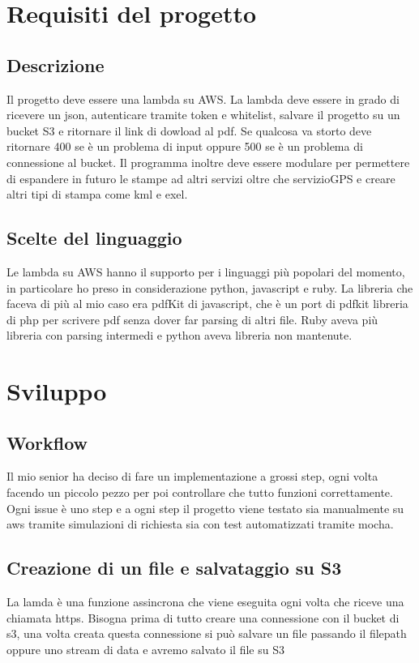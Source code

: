 \documentclass[12pt]{article}
\begin{document}
\section{Requisiti del progetto}
\subsection{Descrizione}
Il progetto deve essere una lambda su AWS. La lambda deve essere in grado di
ricevere un json, autenticare tramite token e whitelist, salvare il progetto su
un bucket S3 e ritornare il link di dowload al pdf. Se qualcosa va storto deve
ritornare 400 se è un problema di input oppure 500 se è un problema di connessione
al bucket.
Il programma inoltre deve essere modulare per permettere di espandere in futuro
le stampe ad altri servizi oltre che servizioGPS e creare altri tipi di stampa
come kml e exel.
\subsection{Scelte del linguaggio}
Le lambda su AWS hanno il supporto per i linguaggi più popolari del momento, in
particolare ho preso in considerazione python, javascript e ruby. La libreria
che faceva di più al mio caso era pdfKit di javascript, che è un port di pdfkit
libreria di php per scrivere pdf senza dover far parsing di altri file.
Ruby aveva più libreria con parsing intermedi e python aveva libreria non mantenute.


\section{Sviluppo}
\subsection{Workflow}
Il mio senior ha deciso di fare un implementazione a grossi step, ogni volta
facendo un piccolo pezzo per poi controllare che tutto funzioni correttamente.
Ogni issue è uno step e a ogni step il progetto viene testato sia manualmente su
aws tramite simulazioni di richiesta sia con test automatizzati tramite mocha.

\subsection{Creazione di un file e salvataggio su S3}
La lamda è una funzione assincrona che viene eseguita ogni volta che riceve una
chiamata https. Bisogna prima di tutto creare una connessione con il bucket di s3,
una volta creata questa connessione si può salvare un file passando il filepath
oppure uno stream di data e avremo salvato il file su S3
\end{document}

